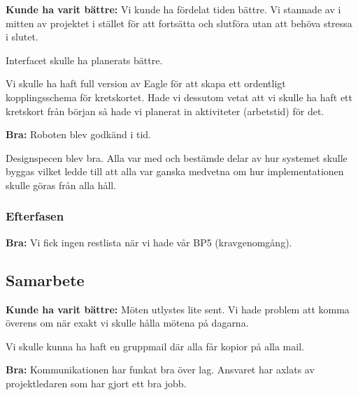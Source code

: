 \textbf{Kunde ha varit bättre:}
\newline
Vi kunde ha fördelat tiden bättre. Vi stannade av i mitten av projektet i stället för att fortsätta och slutföra utan att behöva stressa i slutet.
\newline

Interfacet skulle ha planerats bättre.
\newline

Vi skulle ha haft full version av Eagle för att skapa ett ordentligt kopplingsschema för kretskortet. Hade vi dessutom vetat att vi skulle ha haft ett kretskort från början så hade vi planerat in aktiviteter (arbetstid) för det.
\newline

\textbf{Bra:}
\newline
Roboten blev godkänd i tid.
\newline

Designspecen blev bra. Alla var med och bestämde delar av hur systemet skulle byggas vilket ledde till att alla var ganska medvetna om hur implementationen skulle göras från alla håll.

\subsubsection{Efterfasen}

\textbf{Bra:}
\newline
Vi fick ingen restlista när vi hade vår BP5 (kravgenomgång).

\subsection{Samarbete}

\textbf{Kunde ha varit bättre:}
\newline
Möten utlystes lite sent. Vi hade problem att komma överens om när exakt vi skulle hålla mötena på dagarna.
\newline

Vi skulle kunna ha haft en gruppmail där alla får kopior på alla mail.
\newline

\textbf{Bra:}
\newline
Kommunikationen har funkat bra över lag. Ansvaret har axlats av projektledaren som har gjort ett bra jobb.
\newline

